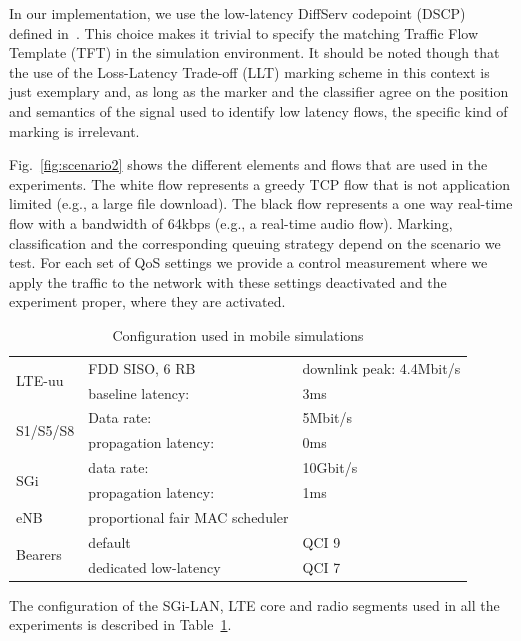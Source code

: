 \documentclass[12pt]{article}
\newcommand{\reffig}[1]{Fig.~\ref{#1}}
\begin{document}
In our implementation, we use the low-latency DiffServ codepoint (DSCP) defined
in~\cite{you-tsvwg-latency-loss-tradeoff-00}.  This choice makes it trivial to
specify the matching Traffic Flow Template (TFT) in the simulation environment.
It should be noted though that the use of the Loss-Latency Trade-off (LLT)
marking scheme in this context is just exemplary and, as long as the marker and
the classifier agree on the position and semantics of the signal used to
identify low latency flows, the specific kind of marking is irrelevant.

\reffig{fig:scenario2} shows the different elements and flows that are used in
the experiments.  The white flow represents a greedy TCP flow that is
not application limited (e.g., a large file download).  The black flow
represents a one way real-time flow with a bandwidth of 64kbps (e.g., a
real-time audio flow).  Marking, classification and the corresponding queuing
strategy depend on the scenario we test. For each set of QoS settings we
provide a control measurement where we apply the traffic to the network with
these settings deactivated and the experiment proper, where they are
activated.

\begin{table}[t]
  \centering
  \begin{tabular}{l l l}
    \toprule
    \multirow{2}{*}{LTE-uu} & FDD SISO, 6 RB & downlink peak: 4.4Mbit/s\\
    & baseline latency: &3ms\\ \midrule
    \multirow{2}{*}{S1/S5/S8} & Data rate: &5Mbit/s \\
    & propagation latency: &0ms \\ \midrule
    \multirow{2}{*}{SGi} & data rate: & 10Gbit/s \\
    & propagation latency: &1ms \\ \midrule
    eNB & proportional fair MAC scheduler&  \\ \midrule
    \multirow{2}{*}{Bearers} & default & QCI 9 \\
    & dedicated low-latency & QCI 7 \\
    \bottomrule
  \end{tabular}
  \caption{Configuration used in mobile simulations}
  \label{tab:lola-config}
\end{table}

The configuration of the SGi-LAN, LTE core and radio segments used in all
the experiments is described in Table~\ref{tab:lola-config}.
\end{document}
